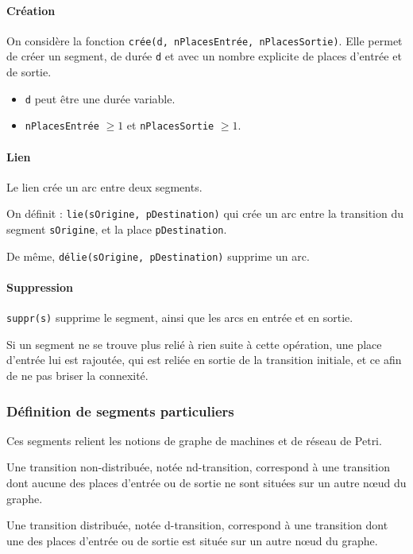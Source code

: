 \paragraph{Création}
On considère la fonction \texttt{crée(d, nPlacesEntrée, nPlacesSortie)}. Elle permet de créer un segment, de durée \texttt{d} et avec un nombre explicite de places d'entrée et de sortie.

\begin{itemize}
\item \texttt{d} peut être une durée variable.
\item \texttt{nPlacesEntrée} $ \geq 1 $ et \texttt{nPlacesSortie} $ \geq 1 $.
\end{itemize}
\paragraph{Lien}
Le lien crée un arc entre deux segments.

On définit : \texttt{lie(sOrigine, pDestination)} qui crée un arc entre la transition du segment \texttt{sOrigine}, et la place \texttt{pDestination}.

De même, \texttt{délie(sOrigine, pDestination)} supprime un arc.

\paragraph{Suppression}
\texttt{suppr(s)} supprime le segment, ainsi que les arcs en entrée et en sortie.

Si un segment ne se trouve plus relié à rien suite à cette opération, une place d'entrée lui est rajoutée, qui est reliée en sortie de la transition initiale, et ce afin de ne pas briser la connexité.

\subsubsection{Définition de segments particuliers} 
Ces segments relient les notions de graphe de machines et de réseau de Petri.
\begin{mydef}[nd-transition]
Une transition non-distribuée, notée nd-transition, correspond à une transition dont aucune des places d'entrée ou de sortie ne sont situées sur un autre nœud du graphe.
\end{mydef}

\begin{mydef}[d-transition]
Une transition distribuée, notée d-transition, correspond à une transition dont une des places d'entrée ou de sortie est située sur un autre nœud du graphe.
\end{mydef}

